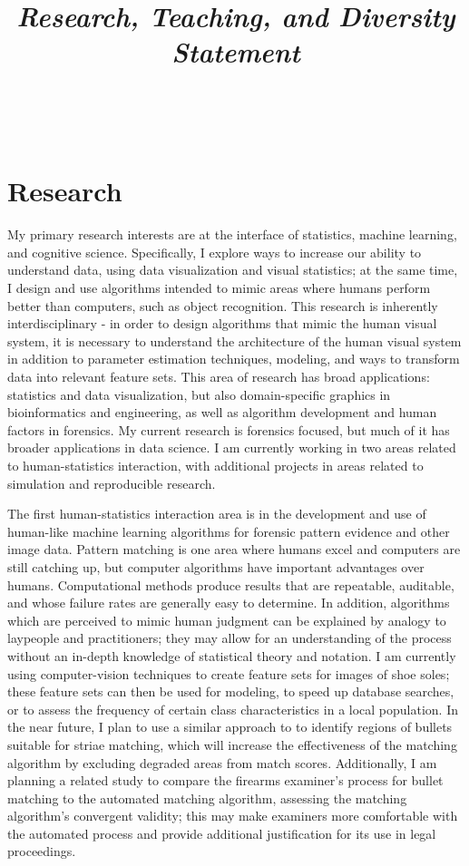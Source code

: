 \documentclass[12pt, letterpaper, sans]{moderncv}
\title{\emph{Research, Teaching, and Diversity Statement}}
\makeatletter
\newcommand{\makesimpletitle}{%
  \recomputeletterlengths%

  \begin{varwidth}[c]{.75\textwidth}
  \if@left\raggedright\fi%
      \if@right\raggedleft\fi%
      \ifthenelse{\equal{\@title}{}}{}{\titlestyle{\@title}}%
  \end{varwidth}\hfill
  \begin{varwidth}[c]{.25\textwidth}%
      \raggedleft%
      \addressfont\textcolor{color2}{%
        {\bfseries\upshape\@firstname~\@lastname}\\
        \ifthenelse{\isundefined{\@addressstreet}}{}{\makenewline\addresssymbol\@addressstreet%
          \ifthenelse{\equal{\@addresscity}{}}{}{\makenewline\@addresscity}%
          \ifthenelse{\equal{\@addresscountry}{}}{}{\makenewline\@addresscountry}}%
        \collectionloop{phones}{%
          \makenewline\csname\collectionloopkey phonesymbol\endcsname\collectionloopitem}%
        \ifthenelse{\isundefined{\@email}}{}{\makenewline\emailsymbol\emaillink{\@email}}%
        \ifthenelse{\isundefined{\@homepage}}{}{\makenewline\homepagesymbol\httplink{\@homepage}}%
        \ifthenelse{\isundefined{\@extrainfo}}{}{\makenewline\@extrainfo}}
    \end{varwidth}
}
\makeatother
\begin{document}
\makesimpletitle

\section{Research}

My primary research interests are at the interface of statistics, machine learning, and cognitive science. Specifically, I explore ways to increase our ability to understand data, using data visualization and visual statistics; at the same time, I design and use algorithms intended to mimic areas where humans perform better than computers, such as object recognition. This research is inherently interdisciplinary - in order to design algorithms that mimic the human visual system, it is necessary to understand the architecture of the human visual system in addition to parameter estimation techniques, modeling, and ways to transform data into relevant feature sets. This area of research has broad applications: statistics and data visualization, but also domain-specific graphics in bioinformatics and engineering, as well as algorithm development and human factors in forensics. My current research is forensics focused, but much of it has broader applications in data science. I am currently working in two areas related to human-statistics interaction, with additional projects in areas related to simulation and reproducible research. 

The first human-statistics interaction area is in the development and use of human-like machine learning algorithms for forensic pattern evidence and other image data. Pattern matching is one area where humans excel and computers are still catching up, but computer algorithms have important advantages over humans. Computational methods produce results that are repeatable, auditable, and whose failure rates are generally easy to determine. In addition, algorithms which are perceived to mimic human judgment can be explained by analogy to laypeople and practitioners; they may allow for an understanding of the process without an in-depth knowledge of statistical theory and notation. I am currently using computer-vision techniques to create feature sets for images of shoe soles; these feature sets can then be used for modeling, to speed up database searches, or to assess the frequency of certain class characteristics in a local population. In the near future, I plan to use a similar approach to to identify regions of bullets suitable for striae matching, which will increase the effectiveness of the matching algorithm by excluding degraded areas from match scores. Additionally, I am planning a related study to compare the firearms examiner's process for bullet matching to the automated matching algorithm, assessing the matching algorithm's convergent validity; this may make examiners more comfortable with the automated process and provide additional justification for its use in legal proceedings. 
\end{document}
